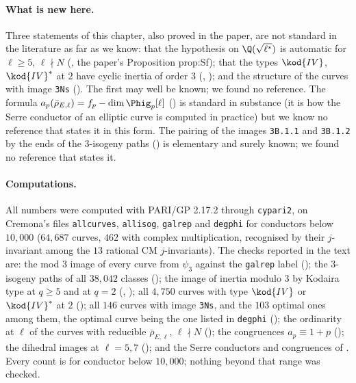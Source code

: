 \paragraph{What is new here.} Three statements of this chapter, also proved in the paper, are not standard in the literature as far as we
know: that the hypothesis on $\Q(\sqrt{\ell^*})$ is automatic for $\ell\ge5$, $\ell\nmid N$ (, the paper's Proposition prop:Sf);
that the types $\kod{IV}$, $\kod{IV}^*$ at $2$ have cyclic inertia of order $3$ (, ); and the structure of the curves
with image \texttt{3Ns} (). The first may well be known; we found no reference. The formula $a_p(\bar\rho_{E,\ell})=f_p-\dim\Phig_p[\ell]$
() is standard in substance (it is how the Serre conductor of an elliptic curve is computed in practice) but we
know no reference that states it in this form. The pairing of the images \texttt{3B.1.1} and \texttt{3B.1.2} by the ends of the $3$-isogeny paths
() is elementary and surely known; we found no reference that states it.

\paragraph{Computations.} All numbers were computed with PARI/GP 2.17.2 \cite{PARI} through \texttt{cypari2}, on Cremona's files \texttt{allcurves},
\texttt{allisog}, \texttt{galrep} and \texttt{degphi} \cite{ecdata} for conductors below $10{,}000$ ($64{,}687$ curves, $462$ with complex multiplication, recognised
by their $j$-invariant among the $13$ rational CM $j$-invariants). The checks reported in
the text are: the mod $3$ image of every curve from $\psi_3$ against the \texttt{galrep} label (); the $3$-isogeny paths of all
$38{,}042$ classes (); the image of inertia modulo $3$
by Kodaira type at $q\ge5$ and at $q=2$ (, ); all $4{,}750$ curves with type $\kod{IV}$ or $\kod{IV}^*$ at $2$
(); all $146$ curves with image \texttt{3Ns}, and the $103$ optimal ones among them, the optimal curve being the one listed in \texttt{degphi}
(); the ordinarity at $\ell$ of the curves with reducible
$\bar\rho_{E,\ell}$, $\ell\nmid N$ (); the congruences $a_p\equiv1+p$ (); the dihedral images at $\ell=5,7$
(); and the Serre conductors and congruences of . Every count is for conductor below
$10{,}000$; nothing beyond that range was checked.

